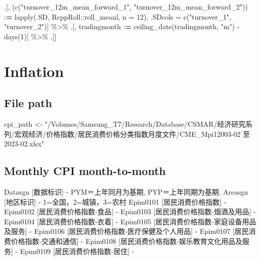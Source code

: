 \documentclass[
]{article}
\newenvironment{Shaded}{\begin{snugshade}}{\end{snugshade}}
\newcommand{\AttributeTok}[1]{\textcolor[rgb]{0.77,0.63,0.00}{#1}}
\newcommand{\DecValTok}[1]{\textcolor[rgb]{0.00,0.00,0.81}{#1}}
\newcommand{\ErrorTok}[1]{\textcolor[rgb]{0.64,0.00,0.00}{\textbf{#1}}}
\newcommand{\FunctionTok}[1]{\textcolor[rgb]{0.00,0.00,0.00}{#1}}
\newcommand{\NormalTok}[1]{#1}
\newcommand{\OtherTok}[1]{\textcolor[rgb]{0.56,0.35,0.01}{#1}}
\newcommand{\SpecialCharTok}[1]{\textcolor[rgb]{0.00,0.00,0.00}{#1}}
\newcommand{\StringTok}[1]{\textcolor[rgb]{0.31,0.60,0.02}{#1}}
\begin{document}
\begin{Shaded}
\begin{Highlighting}[]
\NormalTok{  .[, (}\FunctionTok{c}\NormalTok{(}\StringTok{"turnover\_12m\_mean\_forward\_1"}\NormalTok{, }\StringTok{"turnover\_12m\_mean\_forward\_2"}\NormalTok{)) }\SpecialCharTok{:}\ErrorTok{=} \FunctionTok{lapply}\NormalTok{(.SD, RcppRoll}\SpecialCharTok{::}\NormalTok{roll\_meanl, }\AttributeTok{n =} \DecValTok{12}\NormalTok{), .SDcols }\OtherTok{=} \FunctionTok{c}\NormalTok{(}\StringTok{"turnover\_1"}\NormalTok{, }\StringTok{"turnover\_2"}\NormalTok{)] }\SpecialCharTok{\%\textgreater{}\%} 
\NormalTok{  .[, tradingmonth }\SpecialCharTok{:}\ErrorTok{=} \FunctionTok{ceiling\_date}\NormalTok{(tradingmonth, }\StringTok{"m"}\NormalTok{) }\SpecialCharTok{{-}}\FunctionTok{days}\NormalTok{(}\DecValTok{1}\NormalTok{)] }\SpecialCharTok{\%\textgreater{}\%} 
\NormalTok{  .[]}
\end{Highlighting}
\end{Shaded}

\hypertarget{inflation}{%
\section{Inflation}\label{inflation}}

\hypertarget{file-path-3}{%
\subsection{File path}\label{file-path-3}}

\begin{Shaded}
\begin{Highlighting}[]
\NormalTok{cpi\_path }\OtherTok{\textless{}{-}} \StringTok{"/Volumes/Samsung\_T7/Research/Database/CSMAR/经济研究系列/宏观经济/价格指数/居民消费价格分类指数月度文件/CME\_Mpi12003{-}02 至 2023{-}02.xlsx"}
\end{Highlighting}
\end{Shaded}

\hypertarget{monthly-cpi-month-to-month}{%
\subsection{Monthly CPI month-to-month}\label{monthly-cpi-month-to-month}}

Datasgn {[}数据标识{]} - PYM＝上年同月为基期, PYP＝上年同期为基期.
Areasgn {[}地区标识{]} - 1=全国，2=城镇，3=农村
Epim0101 {[}居民消费价格指数{]} -
Epim0102 {[}居民消费价格指数-食品{]} -
Epim0103 {[}居民消费价格指数-烟酒及用品{]} -
Epim0104 {[}居民消费价格指数-衣着{]} -
Epim0105 {[}居民消费价格指数-家庭设备用品及服务{]} -
Epim0106 {[}居民消费价格指数-医疗保健及个人用品{]} -
Epim0107 {[}居民消费价格指数-交通和通信{]} -
Epim0108 {[}居民消费价格指数-娱乐教育文化用品及服务{]} -
Epim0109 {[}居民消费价格指数-居住{]} -
\end{document}
